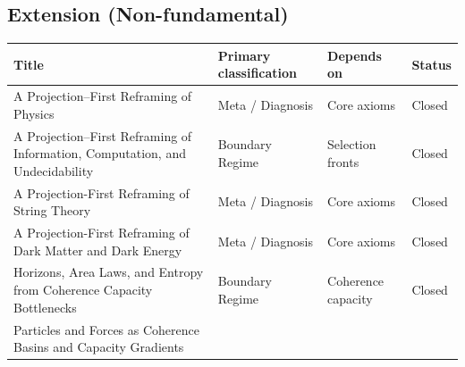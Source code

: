 \documentclass[11pt]{article}
\begin{document}
\subsection{Extension (Non-fundamental)}

\begin{center}
\small
\begin{tabular}{|p{7.2cm}|p{3.6cm}|p{3.6cm}|p{1.6cm}|}
\hline
\textbf{Title} & \textbf{Primary classification} & \textbf{Depends on} & \textbf{Status}\\
\hline
A Projection--First Reframing of Physics
& Meta / Diagnosis & Core axioms & Closed \\
\hline
A Projection--First Reframing of Information, Computation, and Undecidability
& Boundary Regime & Selection fronts & Closed \\
\hline
A Projection-First Reframing of String Theory
& Meta / Diagnosis & Core axioms & Closed \\
\hline
A Projection-First Reframing of Dark Matter and Dark Energy
& Meta / Diagnosis & Core axioms & Closed \\
\hline
Horizons, Area Laws, and Entropy from Coherence Capacity Bottlenecks

& Boundary Regime & Coherence capacity & Closed \\
\hline
Particles and Forces as Coherence Basins and Capacity Gradients


\end{tabular}
\end{center}
\end{document}
